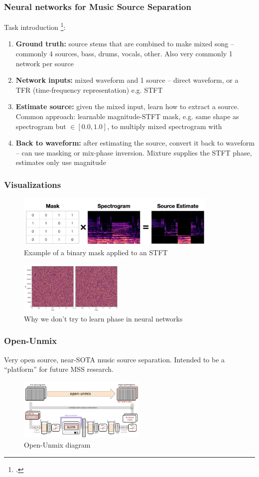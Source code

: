 \documentclass[usenames,dvipsnames]{beamer}
\begin{document}
\begin{frame}[fragile]
	\frametitle{Neural networks for Music Source Separation}
	Task introduction \footcite{musicsepgood}:
	\begin{enumerate}
		\item
			\textbf{Ground truth:} source stems that are combined to make mixed song -- commonly 4 sources, bass, drums, vocals, other. Also very commonly 1 network per source
		\item
			\textbf{Network inputs:} mixed waveform and 1 source -- direct waveform, or a TFR (time-frequency representation)  e.g. STFT
		\item
			\textbf{Estimate source:} given the mixed input, learn how to extract a source. Common approach: learnable magnitude-STFT mask, e.g. same shape as spectrogram but $\in [0.0, 1.0]$, to multiply mixed spectrogram with
		\item
			\textbf{Back to waveform:} after estimating the source, convert it back to waveform -- can use masking or mix-phase inversion. Mixture supplies the STFT phase, estimates only use magnitude
	\end{enumerate}
\end{frame}

\begin{frame}
	\frametitle{Visualizations}
	\begin{figure}[ht]
		\includegraphics[height=2.5cm]{./mask_simple.png}
		\caption{Example of a binary mask applied to an STFT}
	\end{figure}
	\begin{figure}[ht]
		\includegraphics[height=2.5cm]{./whynophase.png}
		\caption{Why we don't try to learn phase in neural networks}
	\end{figure}
\end{frame}

\begin{frame}
	\frametitle{Open-Unmix}
	Very open source, near-SOTA music source separation. Intended to be a ``platform'' for future MSS research.
	\begin{figure}[ht]
		\includegraphics[height=3cm]{./umx1.png}
		\caption{Open-Unmix diagram}
	\end{figure}
\end{frame}
\end{document}
